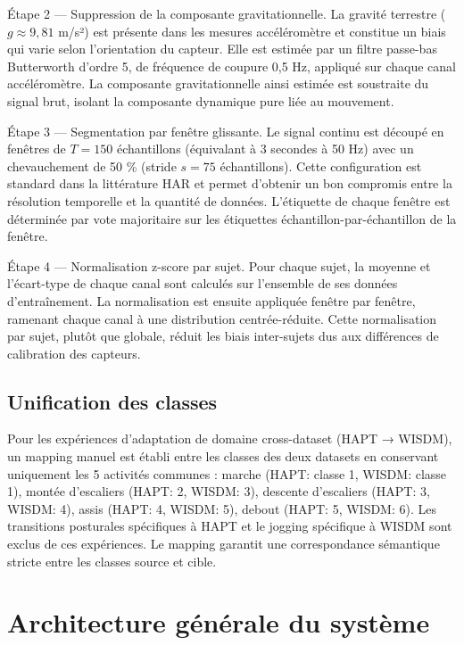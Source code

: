 \documentclass[a4paper,12pt]{report}
\begin{document}
Étape 2 — Suppression de la composante gravitationnelle. La gravité terrestre ($g \approx 9{,}81$ m/s²) est présente dans les mesures accéléromètre et constitue un biais qui varie selon l'orientation du capteur. Elle est estimée par un filtre passe-bas Butterworth d'ordre 5, de fréquence de coupure 0,5 Hz, appliqué sur chaque canal accéléromètre. La composante gravitationnelle ainsi estimée est soustraite du signal brut, isolant la composante dynamique pure liée au mouvement.

Étape 3 — Segmentation par fenêtre glissante. Le signal continu est découpé en fenêtres de $T = 150$ échantillons (équivalant à 3 secondes à 50 Hz) avec un chevauchement de 50 \% (stride $s = 75$ échantillons). Cette configuration est standard dans la littérature HAR et permet d'obtenir un bon compromis entre la résolution temporelle et la quantité de données. L'étiquette de chaque fenêtre est déterminée par vote majoritaire sur les étiquettes échantillon-par-échantillon de la fenêtre.

Étape 4 — Normalisation z-score par sujet. Pour chaque sujet, la moyenne et l'écart-type de chaque canal sont calculés sur l'ensemble de ses données d'entraînement. La normalisation est ensuite appliquée fenêtre par fenêtre, ramenant chaque canal à une distribution centrée-réduite. Cette normalisation par sujet, plutôt que globale, réduit les biais inter-sujets dus aux différences de calibration des capteurs.

\subsection{Unification des classes}

Pour les expériences d'adaptation de domaine cross-dataset (HAPT → WISDM), un mapping manuel est établi entre les classes des deux datasets en conservant uniquement les 5 activités communes : marche (HAPT: classe 1, WISDM: classe 1), montée d'escaliers (HAPT: 2, WISDM: 3), descente d'escaliers (HAPT: 3, WISDM: 4), assis (HAPT: 4, WISDM: 5), debout (HAPT: 5, WISDM: 6). Les transitions posturales spécifiques à HAPT et le jogging spécifique à WISDM sont exclus de ces expériences. Le mapping garantit une correspondance sémantique stricte entre les classes source et cible.

\section{Architecture générale du système}
\end{document}
